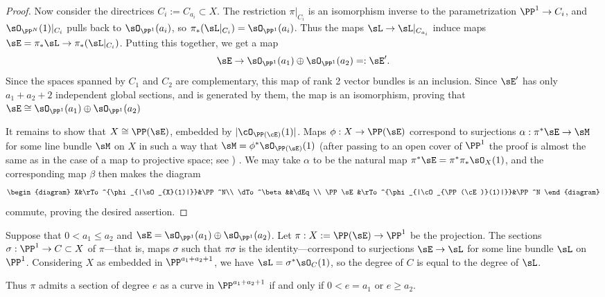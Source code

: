 \begin{proof}
Now consider the directrices $C_{i}:= C_{a_{i}}\subset X$.  The restriction
$\pi|_{C_{i}}$ is an isomorphism inverse to the parametrization $\PP^{1} \to C_{i}$, and $\sO_{\PP^{N}}(1)|_{C_{i}}$ pulls back to $\sO_{\PP^{1}}(a_{i})$, so $\pi_{*}(\sL|_{C_i}) = \sO_{\PP^{1}}(a_{i})$. Thus the maps $\sL \to \sL|_{C_{a_{i}}}$
induce maps $\sE = \pi_{*}\sL \to \pi_{*}( \sL|_{C_i})$. Putting this together, we get a map
$$
\sE \to \sO_{\PP^{1}}(a_{1}) \oplus \sO_{\PP^{1}}(a_{2}) =: \sE'.
$$
Since the spaces spanned by $C_{1}$ and $C_{2}$ are complementary, this map of rank 2 vector bundles is an inclusion. Since $\sE'$ has only $a_{1}+a_{2}+2$ independent global sections, and is generated by them, the map is an isomorphism, proving that $\sE \cong \sO_{\PP^{1}}(a_{1}) \oplus \sO_{\PP^{1}}(a_{2})$

It remains to show that $X \cong \PP(\sE)$, embedded by $|\cO_{\PP(\cE)}(1)|$. Maps $\phi: X \to \PP (\sE)$ correspond to surjections 
$\alpha: \pi^* \sE \to \sM$ for some line bundle $\sM$ on $X$ in such a way that $\sM = \phi^*\sO_{\PP(\sE)}(1)$ (after passing to an open
cover of $\PP^1$ the proof is almost the same as in the case of a map to projective space; see \cite[II.7.12]{Hartshorne1977}) . We may take $\alpha$ to be the 
natural map $\pi^*\sE = \pi^*\pi_*\sO_X(1)$, and the corresponding map $\beta$ then makes the diagram
$$
\begin{diagram}
 X&\rTo^{\phi_{|\sO_{X}(1)|}}&\PP^N\\
\dTo^\beta&&\dEq \\
\PP\sE &\rTo^{\phi_{|\cO_{\PP(\cE)}(1)|}}&\PP^N
\end{diagram}
$$
commute, proving the desired assertion.
\end{proof}
 
\begin{proposition} Suppose that $0<a_1\leq a_2$ and
$\sE = \sO_{\PP^1}(a_1)\oplus \sO_{\PP^1}(a_2)$. Let $\pi: X:= \PP(\sE) \to \PP^1$ be the projection.
The sections $\sigma:\PP^1 \to C\subset X$ of $\pi$---that is, maps $\sigma$ such that $\pi\sigma$ is the 
identity---correspond to surjections
$\sE \to \sL$ for some line bundle $\sL$ on $\PP^1$. Considering  $X$ as embedded in 
$\PP^{a_1+a_2+1}$, we have $\sL = \sigma^*\sO_C(1)$, so the degree of $C$ is equal
to the degree of $\sL$.

Thus $\pi$ admits a section of degree $e$ as a curve in $\PP^{a_1+a_2+1}$ if and only if
$0<e = a_1$ or $e\geq a_2$.
\end{proposition}

